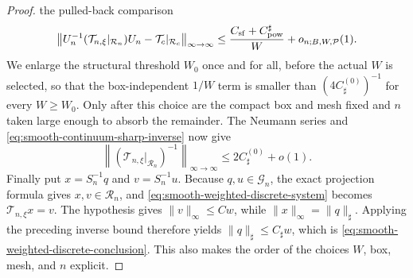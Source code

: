 \documentclass[11pt]{article}
\numberwithin{equation}{section}
\theoremstyle{definition}
\theoremstyle{remark}
\newcommand{\1}{\mathbf 1}
\begin{document}
\begin{proof}
the pulled-back comparison
\begin{equation}
 \left\|U_n^{-1}(\mathcal T_{n,\xi}|_{\mathcal R_n})U_n
       -\mathcal T_c|_{\mathcal R_c}\right\|_{\infty\to\infty}
 \leq\frac{C_{\rm sf}+C_{\rm pow}^{\sharp}}W
       +o_{n;B,W,\mathcal P}(1).
 \label{eq:smooth-pulled-sharp-operator-comparison}
\end{equation}
We enlarge the structural threshold \(W_0\) once and for all, before the
actual \(W\) is selected, so that the
box-independent \(1/W\) term is smaller than
\((4C_\sharp^{(0)})^{-1}\) for every \(W\geq W_0\).  Only after this
choice are the compact box and mesh fixed and \(n\) taken large enough
to absorb the remainder.  The Neumann
series and \eqref{eq:smooth-continuum-sharp-inverse} now give
\[
 \left\|(\mathcal T_{n,\xi}|_{\mathcal R_n})^{-1}\right\|_{\infty\to\infty}
 \le 2C_\sharp^{(0)}+o(1).
\]
Finally put \(x=S_n^{-1}q\) and \(v=S_n^{-1}u\).  Because
\(q,u\in\mathcal G_n\), the exact projection formula gives
\(x,v\in\mathcal R_n\), and
\eqref{eq:smooth-weighted-discrete-system} becomes
\(\mathcal T_{n,\xi}x=v\).  The hypothesis gives
\(\|v\|_\infty\leq Cw\), while
\(\|x\|_\infty=\|q\|_\sharp\).  Applying the preceding inverse bound
therefore yields \(\|q\|_\sharp\leq C_\sharp w\), which is
\eqref{eq:smooth-weighted-discrete-conclusion}.  This also makes the
order of the choices \(W\), box, mesh, and \(n\) explicit.
\end{proof}
\end{document}
